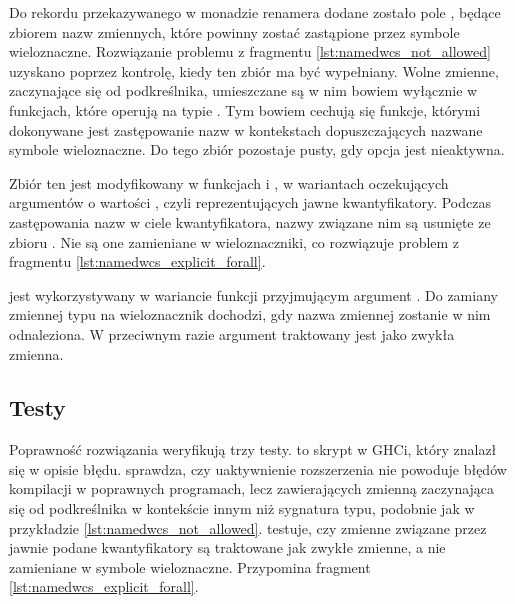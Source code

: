 Do rekordu  przekazywanego w monadzie renamera  dodane zostało
pole , będące zbiorem nazw zmiennych, które powinny
zostać zastąpione przez symbole wieloznaczne. Rozwiązanie problemu z fragmentu
\ref{lst:namedwcs_not_allowed} uzyskano poprzez kontrolę, kiedy ten zbiór ma być
wypełniany. Wolne zmienne, zaczynające się od podkreślnika, umieszczane są w nim
bowiem wyłącznie w funkcjach, które operują na typie
. Tym bowiem cechują się funkcje, którymi dokonywane jest
zastępowanie nazw w kontekstach dopuszczających nazwane symbole wieloznaczne. Do
tego zbiór pozostaje pusty, gdy opcja  jest nieaktywna.

Zbiór ten jest modyfikowany w funkcjach  i , w
wariantach oczekujących argumentów o wartości , czyli
reprezentujących jawne kwantyfikatory. Podczas zastępowania nazw w ciele
kwantyfikatora, nazwy związane nim są usunięte ze zbioru . Nie są one zamieniane w wieloznaczniki, co rozwiązuje problem z
fragmentu \ref{lst:namedwcs_explicit_forall}.

 jest wykorzystywany w wariancie funkcji
 przyjmującym argument . Do zamiany zmiennej typu
na wieloznacznik dochodzi, gdy nazwa zmiennej zostanie w nim odnaleziona. W
przeciwnym razie argument traktowany jest jako zwykła zmienna.

\subsection{Testy} %

Poprawność rozwiązania weryfikują trzy testy.  to skrypt w GHCi,
który znalazł się w opisie błędu.  sprawdza, czy
uaktywnienie rozszerzenia  nie powoduje błędów kompilacji w
poprawnych programach, lecz zawierających zmienną zaczynająca się od
podkreślnika w kontekście innym niż sygnatura typu, podobnie jak w przykładzie
\ref{lst:namedwcs_not_allowed}.  testuje, czy
zmienne związane przez jawnie podane kwantyfikatory są traktowane jak zwykłe
zmienne, a nie zamieniane w symbole wieloznaczne. Przypomina fragment
\ref{lst:namedwcs_explicit_forall}.
